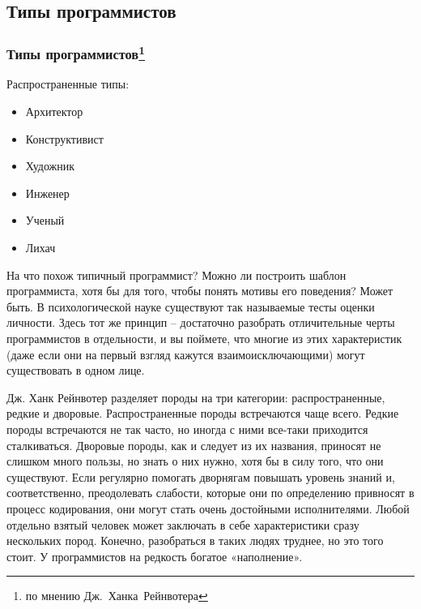 \documentclass{../industrial-development}
\begin{document}
\subsection{Типы программистов}
\begin{frame} \frametitle{Типы программистов\footnote[1]{по мнению Дж.~Ханка~Рейнвотера}}
	\begin{block}{Распространенные типы:}
\begin{itemize}
\item Архитектор
\item Конструктивист 
\item Художник
\item Инженер
\item Ученый
\item Лихач
\end{itemize}
\end{block}
\end{frame}
\lecturenotes
На что похож типичный программист? Можно ли построить шаблон программиста, хотя бы для того, чтобы понять мотивы его поведения? Может быть. В психологической науке существуют так называемые тесты оценки личности. Здесь тот же принцип – достаточно разобрать отличительные черты программистов в отдельности, и вы поймете, что многие из этих характеристик (даже если они на первый взгляд кажутся взаимоисключающими) могут существовать в одном лице. 

Дж. Ханк Рейнвотер разделяет породы на три категории: распространенные, редкие и дворовые. Распространенные породы встречаются чаще всего. 
Редкие породы встречаются не так часто, но иногда с ними все-таки приходится сталкиваться. Дворовые породы, как и следует из их названия, приносят не слишком много пользы, но знать о них нужно, хотя бы в силу того, что они существуют. Если регулярно помогать дворнягам повышать уровень знаний и, соответственно, преодолевать слабости, которые они по определению привносят в процесс кодирования, они могут стать очень достойными исполнителями.
Любой отдельно взятый человек может заключать в себе характеристики сразу нескольких пород. Конечно, разобраться в таких людях труднее, но это того стоит. У программистов на редкость богатое «наполнение». 
\end{document}
